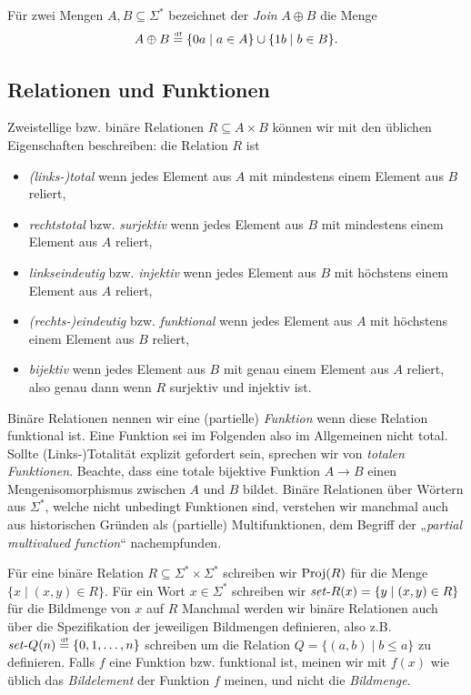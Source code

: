 Für zwei Mengen $A, B\subseteq\Sigma^*$ bezeichnet der \emph{Join} $A\oplus B$ die Menge
\[ A\oplus B \stackrel{\text{\smash{\tiny df}}}{=} \{0a\mid a\in A\} \cup \{1b\mid b\in B\}. \]


\subsection*{Relationen und Funktionen}

Zweistellige bzw. binäre Relationen $R\subseteq A\times B$ können wir mit den üblichen Eigenschaften beschreiben: die Relation $R$ ist
\begin{itemize}
    \item \emph{(links-)total} wenn jedes Element aus $A$ mit mindestens einem Element aus $B$ reliert,
    \item \emph{rechtstotal} bzw. \emph{surjektiv} wenn jedes Element aus $B$ mit mindestens einem Element aus $A$ reliert,
    \item \emph{linkseindeutig} bzw. \emph{injektiv} wenn jedes Element aus $B$ mit höchstens einem Element aus $A$ reliert,
    \item \emph{(rechts-)eindeutig} bzw. \emph{funktional} wenn jedes Element aus $A$ mit höchstens einem Element aus $B$ reliert,
    \item \emph{bijektiv} wenn jedes Element aus $B$ mit genau einem Element aus $A$ reliert, also genau dann wenn $R$ surjektiv und injektiv ist.
\end{itemize}
Binäre Relationen nennen wir eine (partielle) \emph{Funktion} wenn diese Relation funktional ist. Eine Funktion sei im Folgenden also im Allgemeinen nicht total. Sollte (Links-)Totalität explizit gefordert sein, sprechen wir von \emph{totalen Funktionen}.
Beachte, dass eine totale bijektive Funktion $A\to B$ einen Mengenisomorphismus zwischen $A$ und $B$ bildet.
Binäre Relationen über Wörtern aus $\Sigma^*$, welche nicht unbedingt Funktionen sind, verstehen wir manchmal auch aus historischen Gründen als (partielle) Multifunktionen, dem Begriff der „\emph{partial multivalued function}“ nachempfunden.

Für eine binäre Relation $R\subseteq\Sigma^* \times \Sigma^*$ schreiben wir $\operatorname{Proj}(R)$ für die Menge $\{ x\mid (x,y)\in R \}$. 
Für ein Wort $x\in\Sigma^*$ schreiben wir $\mathit{set}\text{-}{}R(x)=\{ y\mid (x,y)\in R \}$ für die Bildmenge von $x$ auf $R$
Manchmal werden wir binäre Relationen auch über die Spezifikation der jeweiligen Bildmengen definieren, also z.B. $\mathit{set}\text{-}{}Q(n) \stackrel{\text{\smash{\tiny df}}}{=} \{ 0, 1, \dots, n\}$ schreiben um die Relation $Q=\{ (a,b)\mid b\leq a \}$ zu definieren.
Falls $f$ eine Funktion bzw. funktional ist, meinen wir mit $f(x)$ wie üblich das \emph{Bildelement} der Funktion $f$ meinen, und nicht die \emph{Bildmenge}. 



